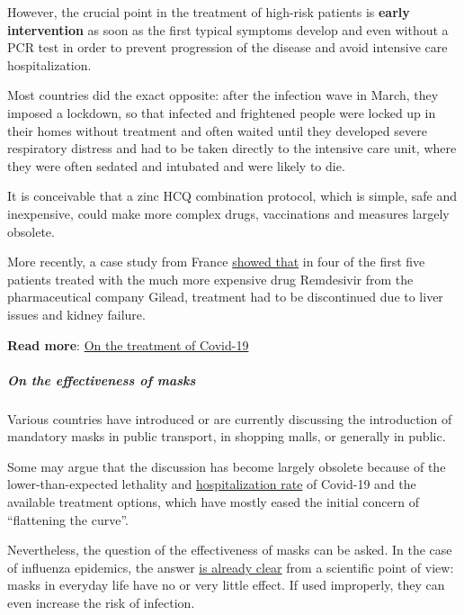 However, the crucial point in the treatment of high-risk patients is
\textbf{early intervention} as soon as the first typical symptoms
develop and even without a PCR test in order to prevent progression of
the disease and avoid intensive care hospitalization.

Most countries did the exact opposite: after the infection wave in
March, they imposed a lockdown, so that infected and frightened people
were locked up in their homes without treatment and often waited until
they developed severe respiratory distress and had to be taken directly
to the intensive care unit, where they were often sedated and intubated
and were likely to die.

It is conceivable that a zinc HCQ combination protocol, which is simple,
safe and inexpensive, could make more complex drugs, vaccinations and
measures largely obsolete.

More recently, a case study from France
\href{https://www.sciencedirect.com/science/article/pii/S1201971220305282}{showed
that} in four of the first five patients treated with the much more
expensive drug Remdesivir from the pharmaceutical company Gilead,
treatment had to be discontinued due to liver issues and kidney failure.

\textbf{Read more}:
\href{https://swprs.org/on-the-treatment-of-covid-19/}{On the treatment
of Covid-19}

\hypertarget{on-the-effectiveness-of-masks}{%
\subparagraph{\texorpdfstring{\textbf{On the effectiveness of
masks}}{On the effectiveness of masks}}\label{on-the-effectiveness-of-masks}}

Various countries have introduced or are currently discussing the
introduction of mandatory masks in public transport, in shopping malls,
or generally in public.

Some may argue that the discussion has become largely obsolete because
of the lower-than-expected lethality and
\href{https://swprs.org/studies-on-covid-19-lethality/\#hospitalizations}{hospitalization
rate} of Covid-19 and the available treatment options, which have mostly
eased the initial concern of ``flattening the curve''.

Nevertheless, the question of the effectiveness of masks can be asked.
In the case of influenza epidemics, the answer
\href{https://wwwnc.cdc.gov/eid/article/26/5/19-0994_article}{is already
clear} from a scientific point of view: masks in everyday life have no
or very little effect. If used improperly, they can even increase the
risk of infection.

